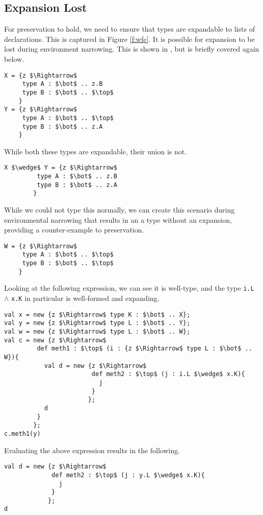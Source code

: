 \documentclass{llncs}
\begin{document}
\subsection{Expansion Lost}
For preservation to hold, we need to ensure that types are expandable 
to lists of declarations. This is captured in Figure \ref{f:wfe}. It is 
possible for expansion to be lost during environment narrowing. This is 
shown in \cite{Amin:2012}, but is briefly covered again below.
\begin{lstlisting}[mathescape, style=custom_lang]
X = {z $\Rightarrow$
     type A : $\bot$ .. z.B
     type B : $\bot$ .. $\top$
    }
Y = {z $\Rightarrow$
     type A : $\bot$ .. $\top$
     type B : $\bot$ .. z.A
    }
\end{lstlisting}
While both these types are expandable, their union is not.
\begin{lstlisting}[mathescape, style=custom_lang]
X $\wedge$ Y = {z $\Rightarrow$
         type A : $\bot$ .. z.B
         type B : $\bot$ .. z.A
        }
\end{lstlisting}
While we could not type this normally, we can create this 
scenario during environmental narrowing that results in 
an a type without an expansion, providing a counter-example 
to preservation.
\begin{lstlisting}[mathescape, style=custom_lang]
W = {z $\Rightarrow$
     type A : $\bot$ .. $\top$
     type B : $\bot$ .. $\top$
    }
\end{lstlisting}
Looking at the following expression, we can see it is well-type, 
and the type \texttt{i.L} $\wedge$ \texttt{x.K} in particular is 
well-formed and expanding.
\begin{lstlisting}[mathescape, style=custom_lang]
val x = new {z $\Rightarrow$ type K : $\bot$ .. X};
val y = new {z $\Rightarrow$ type L : $\bot$ .. Y};
val w = new {z $\Rightarrow$ type L : $\bot$ .. W};
val c = new {z $\Rightarrow$
         def meth1 : $\top$ (i : {z $\Rightarrow$ type L : $\bot$ .. W}){
           val d = new {z $\Rightarrow$
                        def meth2 : $\top$ (j : i.L $\wedge$ x.K){
                          j
                        }
                       };
           d
         }
        };
c.meth1(y)
\end{lstlisting}
Evaluating the above expression results in the following.
\begin{lstlisting}[mathescape, style=custom_lang]
val d = new {z $\Rightarrow$
             def meth2 : $\top$ (j : y.L $\wedge$ x.K){
               j
             }
            };
d
\end{lstlisting}
\end{document}
